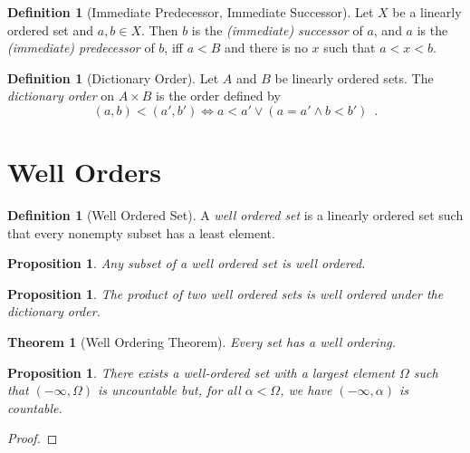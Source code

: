 \documentclass{book}
\let\qed\relax
\newtheorem{prop}[ax]{Proposition}
\newtheorem{thm}[ax]{Theorem}
\theoremstyle{definition}
\newtheorem{df}[ax]{Definition}
\begin{document}
\begin{df}[Immediate Predecessor, Immediate Successor]
Let $X$ be a linearly ordered set and $a,b \in X$. Then $b$ is the \emph{(immediate) successor} of $a$, and $a$ is the \emph{(immediate) predecessor} of $b$, iff $a < B$ and there is no $x$ such that $a < x < b$.
\end{df}

\begin{df}[Dictionary Order]
Let $A$ and $B$ be linearly ordered sets. The \emph{dictionary order} on $A \times B$ is the order defined by
\[ (a,b) < (a',b') \Leftrightarrow a < a' \vee (a = a' \wedge b < b') \enspace . \]
\end{df}

\section{Well Orders}

\begin{df}[Well Ordered Set]
A \emph{well ordered set} is a linearly ordered set such that every nonempty subset has a least element.
\end{df}

\begin{prop}
Any subset of a well ordered set is well ordered.
\end{prop}

\begin{prop}
The product of two well ordered sets is well ordered under the dictionary order.
\end{prop}

\begin{thm}[Well Ordering Theorem]
Every set has a well ordering.
\end{thm}


\begin{prop}
There exists a well-ordered set with a largest element $\Omega$ such that $(-\infty, \Omega)$ is uncountable but, for all $\alpha < \Omega$, we have $(-\infty, \alpha)$ is countable.
\end{prop}

\begin{proof}
\pf
{}
\step{4}{\pflet{$A = (-\infty, \Omega]$}}
\qed
\end{proof}
\end{document}
